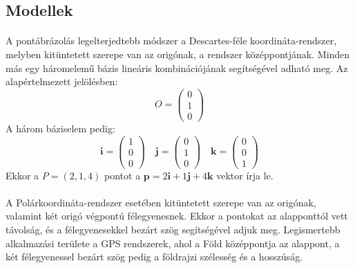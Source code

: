 \documentclass[12pt]{report}
\begin{document}
\subsection{Modellek}
\paragraph{}
A pontábrázolás legelterjedtebb módszer a Descartes-féle koordináta-rendszer, melyben kitüntetett szerepe van az origónak, a rendszer középpontjának. Minden más egy háromelemű bázis lineáris kombinációjának segítségével adható meg. Az alapértelmezett jelölésben:
$$
O = \left( \begin{array}{c} 0\\ 1\\ 0 \end{array} \right)
$$
A három báziselem pedig:
$$
\mathbf{i} = \left( \begin{array}{c} 1\\ 0\\ 0 \end{array} \right) \quad \mathbf{j} = \left( \begin{array}{c} 0\\ 1\\ 0 \end{array} \right) \quad \mathbf{k} = \left( \begin{array}{c} 0\\ 0\\ 1 \end{array} \right)
$$
Ekkor a $P = (2, 1, 4)$ pontot a $\mathbf{p} = 2 \mathbf{i} + 1 \mathbf{j} + 4 \mathbf{k}$ vektor írja le.
\paragraph{}
A Polárkoordináta-rendszer esetében kitüntetett szerepe van az origónak, valamint két origó végpontú félegyenesnek. Ekkor a pontokat az alapponttól vett távolság, és a félegyenesekkel bezárt szög segítségével adjuk meg. Legismertebb alkalmazási területe a GPS rendszerek, ahol a Föld középpontja az alappont, a két félegyenessel bezárt szög pedig a földrajzi szélesség és a hosszúság.
\end{document}
